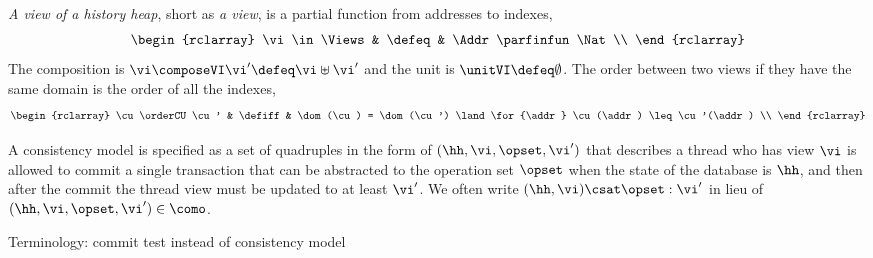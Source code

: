 \begin{defn}[Views]
\label{def:cuts}
\label{def:views}
\emph{A view of a history heap}, short as \emph{a view}, is a partial function from addresses to indexes,
\[
\begin{rclarray}
    \vi \in \Views & \defeq & \Addr \parfinfun \Nat \\
\end{rclarray}
\]                                                                     
The composition is \( \vi \composeVI \vi' \defeq \vi \uplus \vi'\) and the unit is \( \unitVI \defeq \emptyset\).
The order between two views if they have the same domain is the order of all the indexes, 
\[
\begin{rclarray}
    \cu \orderCU \cu' & \defiff & \dom(\cu) = \dom(\cu') \land \for{\addr} \cu(\addr) \leq \cu'(\addr) \\
\end{rclarray}
\]
\end{defn}

A consistency model is specified as a set of quadruples in the form of \( ( \hh, \vi, \opset, \vi' ) \) that describes a thread who has view \( \vi \) is allowed to commit a single transaction that can be abstracted to the operation set \( \opset \) when the state of the database is \( \hh \), and then after the commit the thread view must be updated to at least \( \vi' \).
We often write \( (\hh, \vi) \csat \opset : \vi' \) in lieu of \( (\hh, \vi, \opset, \vi') \in \como \).


\ac{Terminology: commit test instead of consistency model}

